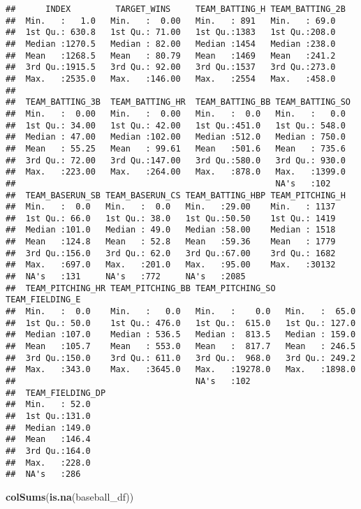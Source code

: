 \documentclass[
]{article}
\newenvironment{Shaded}{\begin{snugshade}}{\end{snugshade}}
\newcommand{\KeywordTok}[1]{\textcolor[rgb]{0.13,0.29,0.53}{\textbf{#1}}}
\newcommand{\NormalTok}[1]{#1}
\begin{document}
\begin{verbatim}
##      INDEX         TARGET_WINS     TEAM_BATTING_H TEAM_BATTING_2B
##  Min.   :   1.0   Min.   :  0.00   Min.   : 891   Min.   : 69.0  
##  1st Qu.: 630.8   1st Qu.: 71.00   1st Qu.:1383   1st Qu.:208.0  
##  Median :1270.5   Median : 82.00   Median :1454   Median :238.0  
##  Mean   :1268.5   Mean   : 80.79   Mean   :1469   Mean   :241.2  
##  3rd Qu.:1915.5   3rd Qu.: 92.00   3rd Qu.:1537   3rd Qu.:273.0  
##  Max.   :2535.0   Max.   :146.00   Max.   :2554   Max.   :458.0  
##                                                                  
##  TEAM_BATTING_3B  TEAM_BATTING_HR  TEAM_BATTING_BB TEAM_BATTING_SO 
##  Min.   :  0.00   Min.   :  0.00   Min.   :  0.0   Min.   :   0.0  
##  1st Qu.: 34.00   1st Qu.: 42.00   1st Qu.:451.0   1st Qu.: 548.0  
##  Median : 47.00   Median :102.00   Median :512.0   Median : 750.0  
##  Mean   : 55.25   Mean   : 99.61   Mean   :501.6   Mean   : 735.6  
##  3rd Qu.: 72.00   3rd Qu.:147.00   3rd Qu.:580.0   3rd Qu.: 930.0  
##  Max.   :223.00   Max.   :264.00   Max.   :878.0   Max.   :1399.0  
##                                                    NA's   :102     
##  TEAM_BASERUN_SB TEAM_BASERUN_CS TEAM_BATTING_HBP TEAM_PITCHING_H
##  Min.   :  0.0   Min.   :  0.0   Min.   :29.00    Min.   : 1137  
##  1st Qu.: 66.0   1st Qu.: 38.0   1st Qu.:50.50    1st Qu.: 1419  
##  Median :101.0   Median : 49.0   Median :58.00    Median : 1518  
##  Mean   :124.8   Mean   : 52.8   Mean   :59.36    Mean   : 1779  
##  3rd Qu.:156.0   3rd Qu.: 62.0   3rd Qu.:67.00    3rd Qu.: 1682  
##  Max.   :697.0   Max.   :201.0   Max.   :95.00    Max.   :30132  
##  NA's   :131     NA's   :772     NA's   :2085                    
##  TEAM_PITCHING_HR TEAM_PITCHING_BB TEAM_PITCHING_SO  TEAM_FIELDING_E 
##  Min.   :  0.0    Min.   :   0.0   Min.   :    0.0   Min.   :  65.0  
##  1st Qu.: 50.0    1st Qu.: 476.0   1st Qu.:  615.0   1st Qu.: 127.0  
##  Median :107.0    Median : 536.5   Median :  813.5   Median : 159.0  
##  Mean   :105.7    Mean   : 553.0   Mean   :  817.7   Mean   : 246.5  
##  3rd Qu.:150.0    3rd Qu.: 611.0   3rd Qu.:  968.0   3rd Qu.: 249.2  
##  Max.   :343.0    Max.   :3645.0   Max.   :19278.0   Max.   :1898.0  
##                                    NA's   :102                       
##  TEAM_FIELDING_DP
##  Min.   : 52.0   
##  1st Qu.:131.0   
##  Median :149.0   
##  Mean   :146.4   
##  3rd Qu.:164.0   
##  Max.   :228.0   
##  NA's   :286
\end{verbatim}

\begin{Shaded}
\begin{Highlighting}[]
\KeywordTok{colSums}\NormalTok{(}\KeywordTok{is.na}\NormalTok{(baseball\_df))}
\end{Highlighting}
\end{Shaded}
\end{document}

